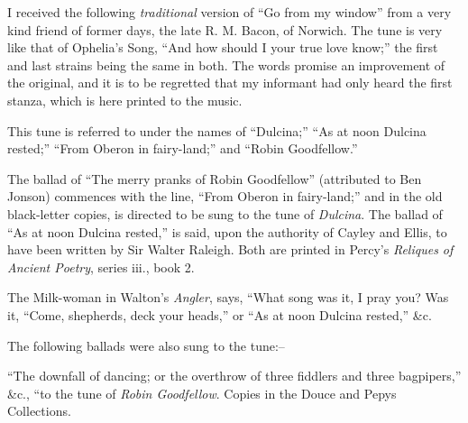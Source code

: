 I received the following \textit{traditional} version of “Go from my window” from a
very kind friend of former days, the late R. M. Bacon, of Norwich.
 The tune is
very like that of Ophelia’s Song, “And how should I your true love know;” the
first and last strains being the same in both. The words promise an improvement
of the original, and it is to be regretted that my informant had only heard
the first stanza, which is here printed to the music.




This tune is referred to under the names of “Dulcina;” “As at noon Dulcina
rested;” “From Oberon in fairy-land;” and “Robin Goodfellow.”

The ballad of “The merry pranks of Robin Goodfellow” (attributed to Ben
Jonson) commences with the line, “From Oberon in fairy-land;” and in the old
black-letter copies, is directed to be sung to the tune of \textit{Dulcina}. The ballad of
“As at noon Dulcina rested,” is said, upon the authority of Cayley and Ellis, to
have been written by Sir Walter Raleigh. Both are printed in Percy’s \textit{Reliques
of Ancient Poetry}, series iii., book 2.

The Milk-woman in Walton’s \textit{Angler}, says, “What song was it, I pray
you? Was it, “Come, shepherds, deck your heads,” or “As at noon Dulcina
rested,” \&c.
\pagebreak

The following ballads were also sung to the tune:--

“The downfall of dancing; or the overthrow of three fiddlers and three bagpipers,”
\&c., “to the tune of \textit{Robin Goodfellow}. Copies in the Douce and Pepys
Collections.

